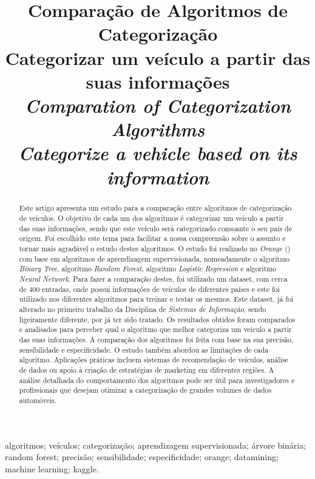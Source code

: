 \documentclass[conference]{IEEEtran}
\title{Comparação de Algoritmos de Categorização \\ \large Categorizar um veículo a partir das suas informações \\
\textit{Comparation of Categorization Algorithms \\ \large Categorize a vehicle based on its information}}
\author{
\IEEEauthorblockN{Martinho Caeiro - 23917 || Paulo Abade - 23919}
\IEEEauthorblockA{
    Instituto Politécnico de Beja\\
    Escola Superior de Tecnologia e Gestão\\
    Beja, Portugal\\
    23917@stu.ipbeja.pt || 23919@stu.ipbeja.pt
}
}
\begin{document}
\maketitle

\begin{abstract}
	Este artigo apresenta um estudo para a comparação entre algoritmos de categorização de veículos. O objetivo de cada um dos
	algoritmos é categorizar um veículo a partir das suas informações, sendo que este veículo será categorizado consoante o seu
	país de origem. Foi escolhido este tema para facilitar a nossa compreensão sobre o assunto e tornar mais agradável o estudo
	destes algoritmos. O estudo foi realizado no \textit{Orange} (\cite{orange}) com base em algoritmos de aprendizagem supervisionada, nomeadamente o algoritmo
	\textit{Binary Tree}, algoritmo \textit{Random Forest}, algoritmo \textit{Logistic Regression} e algoritmo \textit{Neural Network}.
	Para fazer a comparação destes, foi utilizado um dataset, com cerca de 400 entradas, onde possui informações de veículos de
	diferentes países e este foi utilizado nos diferentes algoritmos para treinar e testar os mesmos. Este dataset, já foi alterado
	no primeiro trabalho da Disciplina de \textit{Sistemas de Informação}, sendo ligeiramente diferente, por já ter sido tratado.
	Os resultados obtidos foram comparados e analisados para perceber qual o algoritmo que melhor categoriza um veículo a partir das
	suas informações. A comparação dos algoritmos foi feita com base na sua precisão, sensibilidade e especificidade. O estudo também
	abordou as limitações de cada algoritmo. Aplicações práticas incluem sistemas de recomendação de veículos, análise de dados ou apoio
	à criação de estratégias de marketing em diferentes regiões. A análise detalhada do comportamento dos algoritmos pode ser útil
	para investigadores e profissionais que desejam otimizar a categorização de grandes volumes de dados automóveis.

\end{abstract}

\begin{IEEEkeywords}
	algoritmos; veículos; categorização; aprendizagem supervisionada; árvore binária; random forest; precisão; sensibilidade; especificidade;
	orange; datamining; machine learning; kaggle.
\end{IEEEkeywords}

\end{document}

